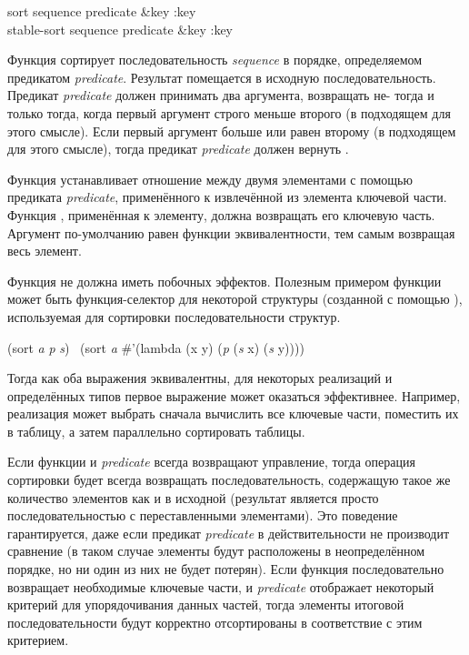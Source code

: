 \begin{defun}[Функция]
sort sequence predicate &key :key \\
stable-sort sequence predicate &key :key

Функция сортирует последовательность \emph{sequence} в порядке, определяемом
предикатом \emph{predicate}. Результат помещается в исходную
последовательность. Предикат \emph{predicate} должен принимать два аргумента,
возвращать не-{\false} тогда и только тогда, когда первый аргумент строго меньше
второго (в подходящем для этого смысле).
Если первый аргумент больше или равен второму (в подходящем для этого смысле),
тогда предикат \emph{predicate} должен вернуть {\false}.

Функция  устанавливает отношение между двумя элементами с помощью
предиката \emph{predicate}, применённого к извлечённой из элемента ключевой
части. Функция , применённая к элементу, должна возвращать его ключевую
часть.
Аргумент  по-умолчанию равен функции эквивалентности, тем самым
возвращая весь элемент.

Функция  не должна иметь побочных эффектов.
Полезным примером функции  может быть функция-селектор для некоторой
структуры (созданной с помощью ), используемая для сортировки
последовательности структур.
\begin{lisp}
(sort \emph{a} \emph{p}  \emph{s})
   \EQ\ (sort \emph{a} \#'(lambda (x y) (\emph{p} (\emph{s} x) (\emph{s} y))))
\end{lisp}
Тогда как оба выражения эквивалентны, для некоторых реализаций и определённых
типов первое выражение может оказаться эффективнее.
Например, реализация может выбрать сначала вычислить все ключевые части,
поместить их в таблицу, а затем параллельно сортировать таблицы.

Если функции  и \emph{predicate} всегда возвращают управление, тогда
операция сортировки будет всегда возвращать последовательность, содержащую такое
же количество элементов как и в исходной (результат является просто
последовательностью с переставленными элементами).
Это поведение гарантируется, даже если предикат \emph{predicate} в
действительности не производит сравнение (в таком случае элементы будут
расположены в неопределённом порядке, но ни один из них не будет потерян). Если
функция  последовательно возвращает необходимые ключевые части, и
\emph{predicate} отображает некоторый критерий для упорядочивания данных частей,
тогда элементы итоговой последовательности будут корректно отсортированы в
соответствие с этим критерием.


\end{defun}
